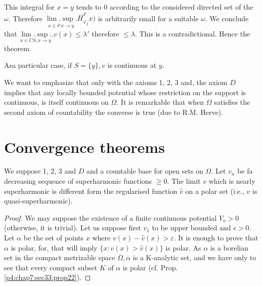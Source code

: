 This integral for $x = y$ tends to $0$ according to the considered
directed set of the $\omega$. Therefore $\underset{x \in \delta' x \to
  y}{\lim. \sup.} \bar{H}^{\delta'}_{\varphi_2} x)$ is arbitrarily small
for a suitable $\omega$. We conclude that $\underset{x \in C S, x \to
  y}{\lim. \sup.}. v (x) \le \lambda'$ therefore $\le \lambda$. This
is a contradictional. Hence the theorem. 

\setcounter{remark}{0}
\begin{remark}\label{p4:chap8:sec35:rem1} %
  As\pageoriginale a particular case, if $S = \{y\}, v$ is continuous at $y$.
\end{remark}

\begin{remark}\label{p4:chap8:sec35:rem2} %
  We want to emphasize that only with the axioms
  1, 2, 3 and, the
  axiom $D$ implies that any locally bounded potential whose
  restriction on the support is continuous, is itself continuous on
  $\Omega$. It is remarkable that when $\Omega$ satisfies the second
  axiom of countability the converse is true (due to R.M. Herve). 
\end{remark}
 
\section{Convergence theorems}\label{p4:chap8:sec36}%
 
\begin{thm}\label{p4:chap8:sec36:thm27} %
  We suppose 1, 2, 3 and $D$ and a countable base for open sets on
  $\Omega$. Let $v_n$ be fa decreasing sequence of superharmonic
  functions $\ge 0$. The limit $v$ which is nearly superharmonic is
  different form the regularised function $\hat{v}$ on a polar set
  (i.e., $v$ is quasi-superharmonic).  
\end{thm}

\begin{proof} 
  We may suppose the existence of a finite continuous potential $V_o >
  0$ (otherwise, it is trivial). Let us suppose first $v_1$ to be
  upper bounded and $\epsilon >  0$. Let $\alpha$ be the set of points $x$
  where $v(x) - \hat{v} (x) > \varepsilon$. It is enough to prove that
  $\alpha$ is polar, for, that will imply $\{x : v (x) > \hat{v}
  (x)\}$ is polar. As $\alpha$ is a borelian set in the compact
  metrizable space $\bar{\Omega}, \alpha$ is a K-analytic set, and we
  have only to see that every compact subset $K$ of $\alpha$ is polar
  (cf. Prop. \ref{p4:chap7:sec33:prop22}). 
\end{proof}

